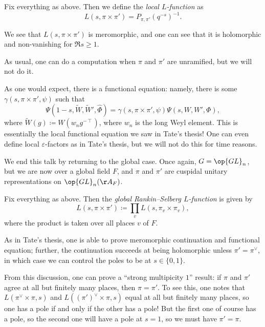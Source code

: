 \documentclass{article}
\begin{document}
\begin{definition}
	Fix everything as above. Then we define the \textit{local $L$-function} as
	\[L(s,\pi\times\pi')=P_{\pi,\pi'}\left(q^{-s}\right)^{-1}.\]
\end{definition}
\begin{remark}
	We see that $L(s,\pi\times\pi')$ is meromorphic, and one can see that it is holomorphic and non-vanishing for $\Re s\ge1$.
\end{remark}
\begin{remark}
	As usual, one can do a computation when $\pi$ and $\pi'$ are unramified, but we will not do it.
\end{remark}
\begin{remark}
	As one would expect, there is a functional equation: namely, there is some $\gamma(s,\pi\times\pi',\psi)$ such that
	\[\Psi(1-s,\widetilde W,\widetilde W',\widehat\Phi)=\gamma(s,\pi\times\pi',\psi)\Psi(s,W,W',\Phi),\]
	where $\widetilde W(g)\coloneqq W(w_ng^{-\intercal})$, where $w_n$ is the long Weyl element. This is essentially the local functional equation we saw in Tate's thesis! One can even define local $\varepsilon$-factors as in Tate's thesis, but we will not do this for time reasons.
\end{remark}
We end this talk by returning to the global case. Once again, $G=\op{GL}_n$, but we are now over a global field $F$, and $\pi$ and $\pi'$ are cuspidal unitary representations on $\op{GL}_n(\AA_F)$.
\begin{definition}
	Fix everything as above. Then the \textit{global Rankin--Selberg $L$-function} is given by
	\[L(s,\pi\times\pi')\coloneqq\prod_vL(s,\pi_v\times\pi_v),\]
	where the product is taken over all places $v$ of $F$.
\end{definition}
As in Tate's thesis, one is able to prove meromorphic continuation and functional equation; further, the continuation succeeds at being holomorphic unless $\pi'=\pi^\lor$, in which case we can control the poles to be at $s\in\{0,1\}$.
\begin{remark}
	From this discussion, one can prove a ``strong multipicity $1$'' result: if $\pi$ and $\pi'$ agree at all but finitely many places, then $\pi=\pi'$. To see this, one notes that $L(\pi^\lor\times\pi,s)$ and $L((\pi')^\lor\times\pi,s)$ equal at all but finitely many places, so one has a pole if and only if the other has a pole! But the first one of course has a pole, so the second one will have a pole at $s=1$, so we must have $\pi'=\pi$.
\end{remark}
\end{document}

